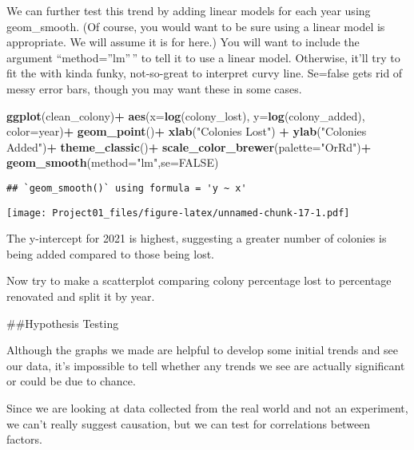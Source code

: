 \documentclass[
]{article}
\newenvironment{Shaded}{\begin{snugshade}}{\end{snugshade}}
\newcommand{\AttributeTok}[1]{\textcolor[rgb]{0.13,0.29,0.53}{#1}}
\newcommand{\ConstantTok}[1]{\textcolor[rgb]{0.56,0.35,0.01}{#1}}
\newcommand{\FunctionTok}[1]{\textcolor[rgb]{0.13,0.29,0.53}{\textbf{#1}}}
\newcommand{\NormalTok}[1]{#1}
\newcommand{\SpecialCharTok}[1]{\textcolor[rgb]{0.81,0.36,0.00}{\textbf{#1}}}
\newcommand{\StringTok}[1]{\textcolor[rgb]{0.31,0.60,0.02}{#1}}
\begin{document}
We can further test this trend by adding linear models for each year
using geom\_smooth. (Of course, you would want to be sure using a linear
model is appropriate. We will assume it is for here.) You will want to
include the argument ``method=''lm''\,'' to tell it to use a linear
model. Otherwise, it'll try to fit the with kinda funky, not-so-great to
interpret curvy line. Se=false gets rid of messy error bars, though you
may want these in some cases.

\begin{Shaded}
\begin{Highlighting}[]
\FunctionTok{ggplot}\NormalTok{(clean\_colony)}\SpecialCharTok{+}  
  \FunctionTok{aes}\NormalTok{(}\AttributeTok{x=}\FunctionTok{log}\NormalTok{(colony\_lost), }\AttributeTok{y=}\FunctionTok{log}\NormalTok{(colony\_added), }\AttributeTok{color=}\NormalTok{year)}\SpecialCharTok{+} 
  \FunctionTok{geom\_point}\NormalTok{()}\SpecialCharTok{+} 
  \FunctionTok{xlab}\NormalTok{(}\StringTok{"Colonies Lost"}\NormalTok{) }\SpecialCharTok{+}
  \FunctionTok{ylab}\NormalTok{(}\StringTok{"Colonies Added"}\NormalTok{)}\SpecialCharTok{+}
  \FunctionTok{theme\_classic}\NormalTok{()}\SpecialCharTok{+}
  \FunctionTok{scale\_color\_brewer}\NormalTok{(}\AttributeTok{palette=}\StringTok{"OrRd"}\NormalTok{)}\SpecialCharTok{+}
  \FunctionTok{geom\_smooth}\NormalTok{(}\AttributeTok{method=}\StringTok{"lm"}\NormalTok{,}\AttributeTok{se=}\ConstantTok{FALSE}\NormalTok{)}
\end{Highlighting}
\end{Shaded}

\begin{verbatim}
## `geom_smooth()` using formula = 'y ~ x'
\end{verbatim}

\texttt{[image: Project01\_files/figure-latex/unnamed-chunk-17-1.pdf]}

The y-intercept for 2021 is highest, suggesting a greater number of
colonies is being added compared to those being lost.

Now try to make a scatterplot comparing colony percentage lost to
percentage renovated and split it by year.

\#\#Hypothesis Testing

Although the graphs we made are helpful to develop some initial trends
and see our data, it's impossible to tell whether any trends we see are
actually significant or could be due to chance.

Since we are looking at data collected from the real world and not an
experiment, we can't really suggest causation, but we can test for
correlations between factors.
\end{document}
